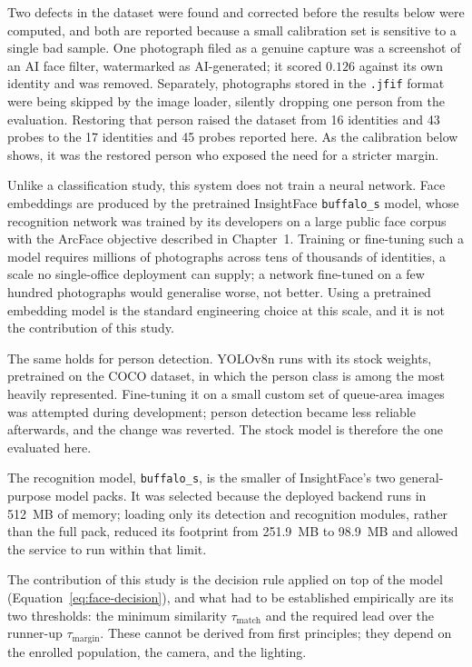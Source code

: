 \documentclass{research}
\begin{document}
Two defects in the dataset were found and corrected before the results
below were computed, and both are reported because a small calibration
set is sensitive to a single bad sample. One photograph filed as a
genuine capture was a screenshot of an AI face filter, watermarked as
AI-generated; it scored $0.126$ against its own identity and was
removed. Separately, photographs stored in the \texttt{.jfif} format
were being skipped by the image loader, silently dropping one person
from the evaluation. Restoring that person raised the dataset from 16
identities and 43 probes to the 17 identities and 45 probes reported
here. As the calibration below shows, it was the
restored person who exposed the need for a stricter margin.

\label{subsec:calibration}

Unlike a classification study, this system does not train a neural
network. Face embeddings are produced by the pretrained InsightFace
\texttt{buffalo\_s} model, whose recognition network was trained by its
developers on a large public face corpus with the ArcFace objective
described in Chapter~1. Training or fine-tuning such a model requires
millions of photographs across tens of thousands of identities, a scale
no single-office deployment can supply; a network fine-tuned on a few
hundred photographs would generalise worse, not better. Using a
pretrained embedding model is the standard engineering choice at this
scale, and it is not the contribution of this study.

The same holds for person detection. YOLOv8n runs with its stock
weights, pretrained on the COCO dataset, in which the person class is
among the most heavily represented. Fine-tuning it on a small custom set
of queue-area images was attempted during development; person detection
became less reliable afterwards, and the change was reverted. The stock
model is therefore the one evaluated here.

The recognition model, \texttt{buffalo\_s}, is the smaller of
InsightFace's two general-purpose model packs. It was selected because
the deployed backend runs in 512~MB of memory; loading only its
detection and recognition modules, rather than the full pack, reduced
its footprint from 251.9~MB to 98.9~MB and allowed the service to run
within that limit.

The contribution of this study is the decision rule applied on top of the model
(Equation~\ref{eq:face-decision}), and what had to be established
empirically are its two thresholds: the minimum similarity
$\tau_{\mathrm{match}}$ and the required lead over the runner-up
$\tau_{\mathrm{margin}}$. These cannot be derived from first principles;
they depend on the enrolled population, the camera, and the lighting.
\end{document}
